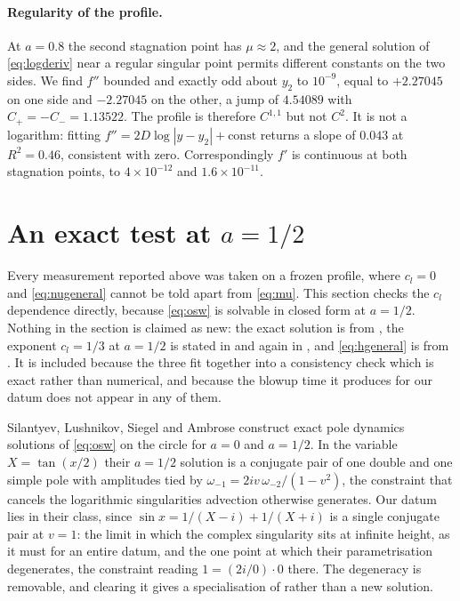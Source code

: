 \documentclass[11pt]{article}
\theoremstyle{definition}
\newcommand{\abs}[1]{\left\lvert #1 \right\rvert}
\begin{document}
\paragraph{Regularity of the profile.} At $a=0.8$ the second stagnation point
has $\mu \approx 2$, and the general solution of \eqref{eq:logderiv} near a
regular singular point permits different constants on the two sides. We find
$f'' $ bounded and exactly odd about $y_2$ to $10^{-9}$, equal to $+2.27045$ on
one side and $-2.27045$ on the other, a jump of $4.54089$ with
$C_+ = -C_- = 1.13522$. The profile is therefore $C^{1,1}$ but not $C^2$. It is
not a logarithm: fitting $f'' = 2D\log\abs{y-y_2} + \text{const}$ returns a
slope of $0.043$ at $R^2=0.46$, consistent with zero. Correspondingly $f'$ is
continuous at both stagnation points, to $4\times10^{-12}$ and
$1.6\times10^{-11}$.

\section{An exact test at \texorpdfstring{$a=1/2$}{a = 1/2}}
\label{sec:exacthalf}

Every measurement reported above was taken on a frozen profile, where $c_l=0$
and \eqref{eq:nugeneral} cannot be told apart from \eqref{eq:mu}. This section
checks the $c_l$ dependence directly, because \eqref{eq:osw} is solvable in
closed form at $a=1/2$. Nothing in the section is claimed as new: the exact
solution is from \cite{slsa2025}, the exponent $c_l = 1/3$ at $a=1/2$ is stated
in \cite{lss2020} and again in \cite{slsa2025}, and \eqref{eq:hgeneral} is from
\cite{xu2026}. It is included because the three fit together into a
consistency check which is exact rather than numerical, and because the blowup
time it produces for our datum does not appear in any of them.

Silantyev, Lushnikov, Siegel and Ambrose \cite{slsa2025} construct exact pole
dynamics solutions of \eqref{eq:osw} on the circle for $a=0$ and $a=1/2$. In
the variable $X=\tan(x/2)$ their $a=1/2$ solution is a conjugate pair of one
double and one simple pole with amplitudes tied by
$\omega_{-1} = 2iv\,\omega_{-2}/(1-v^2)$, the constraint that cancels the
logarithmic singularities advection otherwise generates. Our datum lies in
their class, since $\sin x = 1/(X-i)+1/(X+i)$ is a single conjugate pair at
$v=1$: the limit in which the complex singularity sits at infinite height, as
it must for an entire datum, and the one point at which their parametrisation
degenerates, the constraint reading $1 = (2i/0)\cdot0$ there. The degeneracy is
removable, and clearing it gives a specialisation of \cite{slsa2025} rather
than a new solution.
\end{document}
